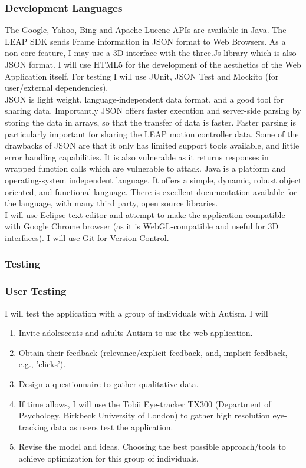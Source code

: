 \documentclass[a4paper, 11pt]{article}
\begin{document}
\subsubsection{Development Languages}
The Google, Yahoo, Bing and Apache Lucene APIs are available in Java. The LEAP SDK sends Frame information in JSON format to Web Browsers. As a non-core feature, I may use a 3D interface with the three.Js library which is also JSON format. I will use HTML5 for the development of the aesthetics of the Web Application itself.
For testing I will use JUnit, JSON Test and Mockito (for user/external dependencies).\\
JSON is light weight, language-independent data format, and a good tool for sharing data. Importantly JSON offers faster execution and server-side parsing by storing the data in arrays, so that the transfer of data is faster. Faster parsing is particularly important for sharing the LEAP motion controller data. Some of the drawbacks of JSON are that it only has limited support tools available, and little error handling capabilities. It is also vulnerable as it returns responses in wrapped function calls which are vulnerable to attack. Java is a platform and operating-system independent language. It offers a simple, dynamic, robust object oriented, and functional language. There is excellent documentation available for the language, with many third party, open source libraries.\\
I will use Eclipse text editor and attempt to make the application compatible with Google Chrome browser (as it is WebGL-compatible and useful for 3D interfaces). I will use Git for Version Control.

\subsubsection{Testing}
\subsubsection{User Testing}
I will test the application with a group of individuals with Autism. I will
\begin{enumerate}
\item Invite adolescents and adults Autism to use the web application.
\item Obtain their feedback (relevance/explicit feedback, and, implicit feedback, e.g., 'clicks'). 
\item Design a questionnaire to gather qualitative data. 
\item If time allows, I will use the Tobii Eye-tracker TX300 (Department of Psychology, Birkbeck University of London) to gather high resolution eye-tracking data as users test the application. 
\item Revise the model and ideas. Choosing the best possible approach/tools to achieve optimization for this group of individuals.
\end{enumerate}
\end{document}
